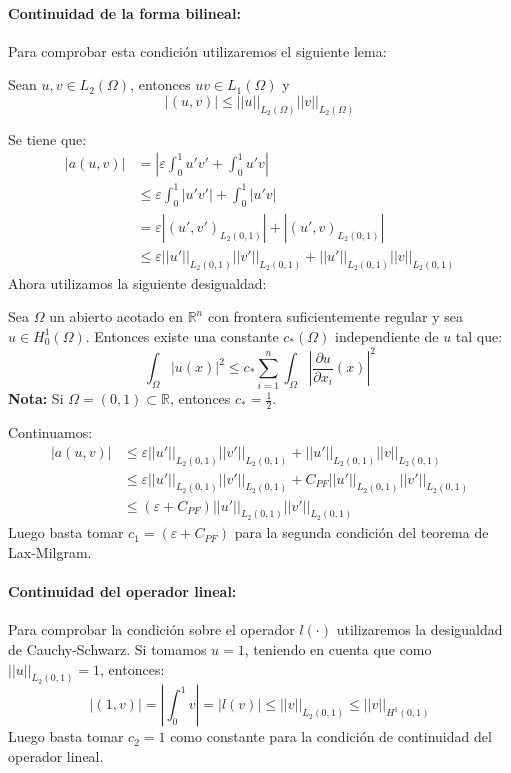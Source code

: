 \documentclass[spanish]{mathnotes}
\begin{document}
	\paragraph{Continuidad de la forma bilineal:}
	Para comprobar esta condición utilizaremos el siguiente lema:
	\begin{lemma}
		Sean $u,v\in L_2(\Omega)$, entonces $uv\in L_1(\Omega)$ y $$|(u,v)| \le ||u||_{L_2(\Omega)}||v||_{L_2(\Omega)}$$
	\end{lemma}
	Se tiene que:
	\begin{align*}
		|a(u,v)| & = \left|\varepsilon\int_0^1 u'v' + \int_0^1u'v\right| \\
		& \le \varepsilon\int_0^1 |u'v'| + \int_0^1 |u'v|\\
		& = \varepsilon\left|(u',v')_{L_2(0,1)}\right| + \left|(u',v)_{L_2(0,1)}\right|\\
		& \le \varepsilon||u'||_{L_2(0,1)}||v'||_{L_2(0,1)} + ||u'||_{L_2(0,1)}||v||_{L_2(0,1)}
	\end{align*}
	Ahora utilizamos la siguiente desigualdad:
	\begin{lemma}
		Sea $\Omega$ un abierto acotado en $\mathbb{R}^n$ con frontera suficientemente regular y sea $u\in H_0^1(\Omega)$. Entonces existe una constante $c_*(\Omega)$ independiente de $u$ tal que:
		$$\int_\Omega |u(x)|^2 \le c_*\sum_{i=1}^n\int_{\Omega}\left|\frac{\partial u}{\partial x_i}(x)\right|^2$$
		\textbf{Nota: } Si $\Omega=(0,1)\subset\mathbb{R}$, entonces $c_*=\frac{1}{2}$.
	\end{lemma}
	Continuamos:
	\begin{align*}
	|a(u,v)| & \le \varepsilon||u'||_{L_2(0,1)}||v'||_{L_2(0,1)} + ||u'||_{L_2(0,1)}||v||_{L_2(0,1)}\\
	&\le \varepsilon||u'||_{L_2(0,1)}||v'||_{L_2(0,1)} + C_{PF}||u'||_{L_2(0,1)}||v'||_{L_2(0,1)}\\
	&\le (\varepsilon + C_{PF})||u'||_{L_2(0,1)}||v'||_{L_2(0,1)}
	\end{align*}
	Luego basta tomar $c_1=(\varepsilon +  C_{PF})$ para la segunda condición del teorema de Lax-Milgram.
	\paragraph{Continuidad del operador lineal:}
	Para comprobar la condición sobre el operador $l(\cdot)$ utilizaremos la desigualdad de Cauchy-Schwarz.
	Si tomamos $u=1$, teniendo en cuenta que como $||u||_{L_2(0,1)} = 1$, entonces:
	$$|(1,v)| = \left|\int_0^1 v\right| = |l(v)| \le ||v||_{L_2(0,1)} \le ||v||_{H^1(0,1)}$$
	Luego basta tomar $c_2 = 1$ como constante para la condición de continuidad del operador lineal.
\end{document}
